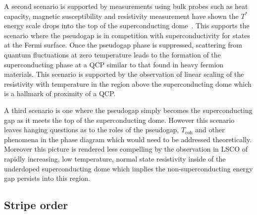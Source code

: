 A second scenario is supported by measurements using bulk probes such as heat capacity, magnetic susceptibility and resistivity measurement have shown the $T^*$ energy scale drops into the top of the superconducting dome~\cite{Tallon2001}. This supports the scenario where the pseudogap is in competition with superconductivity for states at the Fermi surface. Once the pseudogap phase is suppressed, scattering from quantum fluctuations at zero temperature leads to the formation of the superconducting phase at a \ac{QCP} similar to that found in heavy fermion materials. This scenario is supported by the observation of linear scaling of the resistivity with temperature in the region above the superconducting dome which is a hallmark of proximity of a \ac{QCP}.

A third scenario is one where the pseudogap simply becomes the superconducting gap as it meets the top of the superconducting dome. However this scenario leaves hanging questions as to the roles of the pseudogap, $T_{\textrm{coh}}$ and other phenomena in the phase diagram which would need to be addressed theoretically. Moreover this picture is rendered less compelling by the observation in \ac{LSCO} of rapidly increasing, low temperature, normal state resistivity inside of the underdoped superconducting dome which implies the non-superconducting energy gap persists into this region.

\subsection{Stripe order}

